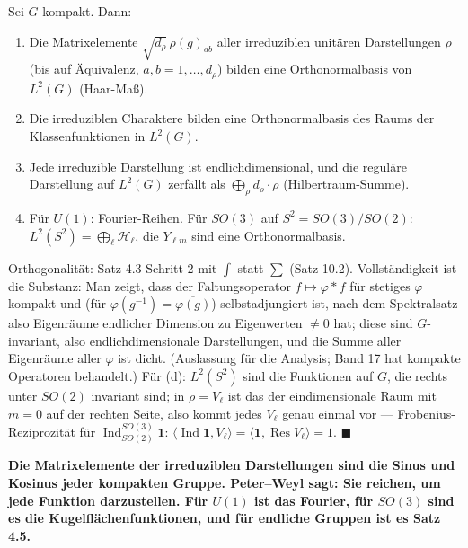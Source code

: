 \begin{merksatz}
Sei $G$ kompakt. Dann:
\begin{enumerate}[label=(\alph*), leftmargin=1.6em]
\item Die Matrixelemente $\sqrt{d_\rho}\,\rho(g)_{ab}$ aller irreduziblen unitären Darstellungen $\rho$ (bis auf Äquivalenz, $a, b = 1, \dots, d_\rho$) bilden eine Orthonormalbasis von $L^{2}(G)$ (Haar-Maß).
\item Die irreduziblen Charaktere bilden eine Orthonormalbasis des Raums der Klassenfunktionen in $L^{2}(G)$.
\item Jede irreduzible Darstellung ist endlichdimensional, und die reguläre Darstellung auf $L^{2}(G)$ zerfällt als $\bigoplus_\rho d_\rho\cdot\rho$ (Hilbertraum-Summe).
\item Für $U(1)$: Fourier-Reihen. Für $SO(3)$ auf $S^{2} = SO(3)/SO(2)$: $L^{2}(S^{2}) = \bigoplus_\ell\mathcal H_\ell$, die $Y_{\ell m}$ sind eine Orthonormalbasis.
\end{enumerate}

Orthogonalität: Satz 4.3 Schritt 2 mit $\int$ statt $\sum$ (Satz 10.2). Vollständigkeit ist die Substanz: Man zeigt, dass der Faltungsoperator $f\mapsto\varphi * f$ für stetiges $\varphi$ kompakt und (für $\varphi(g^{-1}) = \overline{\varphi(g)}$) selbstadjungiert ist, nach dem Spektralsatz also Eigenräume endlicher Dimension zu Eigenwerten $\neq0$ hat; diese sind $G$-invariant, also endlichdimensionale Darstellungen, und die Summe aller Eigenräume aller $\varphi$ ist dicht. (Auslassung für die Analysis; Band 17 hat kompakte Operatoren behandelt.) Für (d): $L^{2}(S^{2})$ sind die Funktionen auf $G$, die rechts unter $SO(2)$ invariant sind; in $\rho = V_\ell$ ist das der eindimensionale Raum mit $m = 0$ auf der rechten Seite, also kommt jedes $V_\ell$ genau einmal vor --- Frobenius-Reziprozität für $\operatorname{Ind}^{SO(3)}_{SO(2)}\mathbf 1$: $\langle\operatorname{Ind}\mathbf 1, V_\ell\rangle = \langle\mathbf 1, \operatorname{Res}V_\ell\rangle = 1$. $\blacksquare$

\begin{center}
\begin{minipage}{0.9\textwidth}
\textbf{Die Matrixelemente der irreduziblen Darstellungen sind die Sinus und Kosinus jeder kompakten Gruppe. Peter--Weyl sagt: Sie reichen, um jede Funktion darzustellen. Für $U(1)$ ist das Fourier, für $SO(3)$ sind es die Kugelflächenfunktionen, und für endliche Gruppen ist es Satz 4.5.}
\end{minipage}
\end{center}
\end{merksatz}

